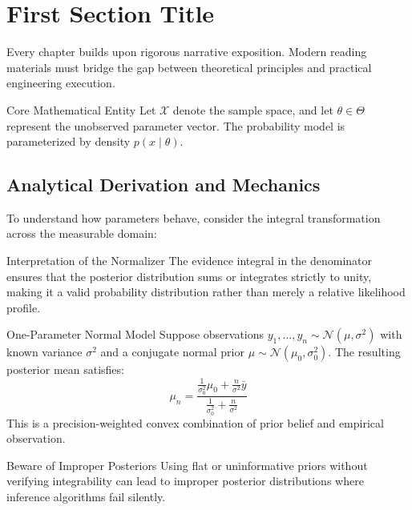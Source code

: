 \section{First Section Title}

Every chapter builds upon rigorous narrative exposition. Modern reading materials must bridge the gap between theoretical principles and practical engineering execution.

\begin{DefinitionBox}{Core Mathematical Entity}
  Let \(\mathcal{X}\) denote the sample space, and let \(\theta \in \Theta\) represent the unobserved parameter vector. The probability model is parameterized by density \(p(x \mid \theta)\).
\end{DefinitionBox}

\subsection{Analytical Derivation and Mechanics}

To understand how parameters behave, consider the integral transformation across the measurable domain:


\begin{InsightBox}{Interpretation of the Normalizer}
  The evidence integral in the denominator ensures that the posterior distribution sums or integrates strictly to unity, making it a valid probability distribution rather than merely a relative likelihood profile.
\end{InsightBox}

\begin{ExampleBox}{One-Parameter Normal Model}
  Suppose observations \(y_1, \dots, y_n \sim \mathcal{N}(\mu, \sigma^2)\) with known variance \(\sigma^2\) and a conjugate normal prior \(\mu \sim \mathcal{N}(\mu_0, \sigma_0^2)\). The resulting posterior mean satisfies:
  \[
    \mu_n = \frac{\frac{1}{\sigma_0^2}\mu_0 + \frac{n}{\sigma^2}\bar{y}}{\frac{1}{\sigma_0^2} + \frac{n}{\sigma^2}}
  \]
  This is a precision-weighted convex combination of prior belief and empirical observation.
\end{ExampleBox}

\begin{WarningBox}{Beware of Improper Posteriors}
  Using flat or uninformative priors without verifying integrability can lead to improper posterior distributions where inference algorithms fail silently.
\end{WarningBox}
